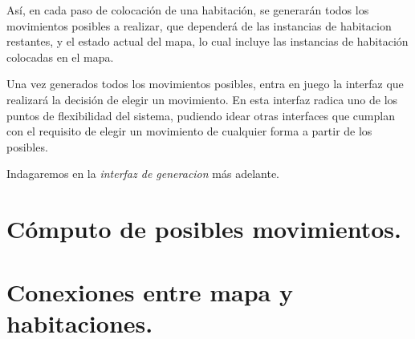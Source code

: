 Así, en cada paso de colocación de una habitación, se generarán todos los movimientos posibles a realizar, que dependerá de las instancias de habitacion restantes, y el estado actual del mapa, lo cual incluye las instancias de habitación colocadas en el mapa.

Una vez generados todos los movimientos posibles, entra en juego la interfaz que realizará la decisión de elegir un movimiento. En esta interfaz radica uno de los puntos de flexibilidad del sistema, pudiendo idear otras interfaces que cumplan con el requisito de elegir un movimiento de cualquier forma a partir de los posibles.

Indagaremos en la \emph{interfaz de generacion} más adelante.


\section{Cómputo de posibles movimientos.}


\section{Conexiones entre mapa y habitaciones.}



